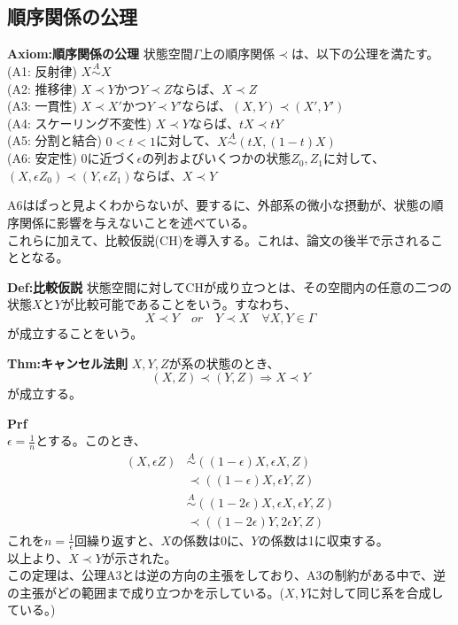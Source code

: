 \documentclass[a4paper,11pt]{jsarticle}
\numberwithin{equation}{section}
\begin{document}
\subsection{順序関係の公理}
\begin{itembox}[l]{\textbf{Axiom:順序関係の公理}}
    状態空間$\Gamma$上の順序関係$\prec$は、以下の公理を満たす。\\
    (A1: 反射律) $ X \overset{A}{\sim} X$\\
    (A2: 推移律) $X \prec Y$かつ$Y \prec Z$ならば、$X \prec Z$\\
    (A3: 一貫性) $X \prec X'$かつ$Y \prec Y'$ならば、$(X,Y) \prec (X',Y')$\\
    (A4: スケーリング不変性) $X \prec Y$ならば、$tX \prec tY$\\
    (A5: 分割と結合) $0<t<1$に対して、$X \overset{A}{\sim} (tX,(1-t)X)$\\
    (A6: 安定性) 0に近づく$\epsilon$の列およびいくつかの状態$Z_0,Z_1$に対して、$(X,\epsilon Z_0) \prec (Y,\epsilon Z_1)$ならば、$X \prec Y$ 
\end{itembox}
A6はぱっと見よくわからないが、要するに、外部系の微小な摂動が、状態の順序関係に影響を与えないことを述べている。\\
これらに加えて、比較仮説(CH)を導入する。これは、論文の後半で示されることとなる。\\
\begin{itembox}[l]{\textbf{Def:比較仮説}}
    状態空間に対してCHが成り立つとは、その空間内の任意の二つの状態$X$と$Y$が比較可能であることをいう。すなわち、
    \begin{equation}
        X \prec Y \quad or \quad Y \prec X \quad \forall X,Y \in \Gamma
    \end{equation}
    が成立することをいう。

\end{itembox}

\begin{itembox}[l]{\textbf{Thm:キャンセル法則}}
    $X,Y,Z$が系の状態のとき、
    \begin{equation}
        (X,Z) \prec (Y,Z) \Rightarrow X \prec Y
    \end{equation}
    が成立する。

\end{itembox}
\textbf{Prf}\\
$\epsilon =\frac{1}{n}$とする。このとき、
\begin{align}
    (X,\epsilon Z) &\overset{A}{\sim} ((1-\epsilon)X,\epsilon X,Z)\\
    &\prec ((1-\epsilon)X,\epsilon Y,Z)\\
    &\overset{A}{\sim} ((1-2\epsilon)X,\epsilon X,\epsilon Y,Z)\\
    &\prec ((1-2\epsilon)Y,2\epsilon Y,Z)
    \end{align}
これを$n=\frac{1}{\epsilon}$回繰り返すと、$X$の係数は0に、$Y$の係数は1に収束する。\\
以上より、$X \prec Y$が示された。\hfill\qedsymbol\\
この定理は、公理A3とは逆の方向の主張をしており、A3の制約がある中で、逆の主張がどの範囲まで成り立つかを示している。($X,Y$に対して同じ系を合成している。)
\end{document}
